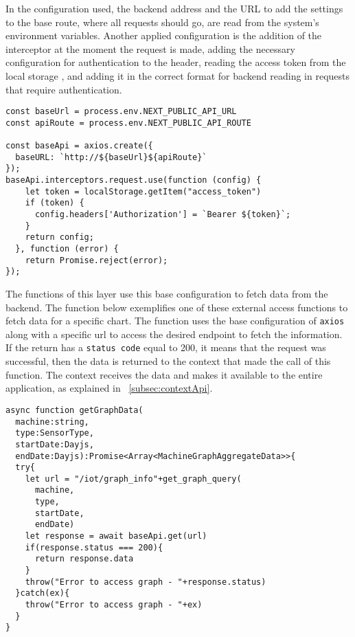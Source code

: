 In the configuration used, the backend address and the URL to add the settings to the base route, where all requests should go, are read from the system's environment variables. Another applied configuration is the addition of the interceptor \cite{axiosInterceptors} at the moment the request is made, adding the necessary configuration for authentication to the header, reading the access token from the local storage \cite{mdnLocalStorage}, and adding it in the correct format for backend reading in requests that require authentication.

\begin{Verbatim}[fontsize=\small, baselinestretch=0.8]
const baseUrl = process.env.NEXT_PUBLIC_API_URL
const apiRoute = process.env.NEXT_PUBLIC_API_ROUTE

const baseApi = axios.create({
  baseURL: `http://${baseUrl}${apiRoute}`
});
baseApi.interceptors.request.use(function (config) {
    let token = localStorage.getItem("access_token")
    if (token) {
      config.headers['Authorization'] = `Bearer ${token}`;
    }
    return config;
  }, function (error) {
    return Promise.reject(error);
});
\end{Verbatim}

The functions of this layer use this base configuration to fetch data from the backend. The function below exemplifies one of these external access functions to fetch data for a specific chart. The function uses the base configuration of \texttt{axios} along with a specific url to access the desired endpoint to fetch the information. If the return has a \texttt{status code} equal to 200, it means that the request was successful, then the data is returned to the context that made the call of this function. The context receives the data and makes it available to the entire application, as explained in ~\ref{subsec:contextApi}.

\begin{Verbatim}[fontsize=\small, baselinestretch=0.8]
async function getGraphData(
  machine:string,
  type:SensorType,
  startDate:Dayjs,
  endDate:Dayjs):Promise<Array<MachineGraphAggregateData>>{
  try{
    let url = "/iot/graph_info"+get_graph_query(
      machine,
      type,
      startDate,
      endDate)
    let response = await baseApi.get(url)
    if(response.status === 200){
      return response.data
    }
    throw("Error to access graph - "+response.status)
  }catch(ex){
    throw("Error to access graph - "+ex)
  }
}
\end{Verbatim}


